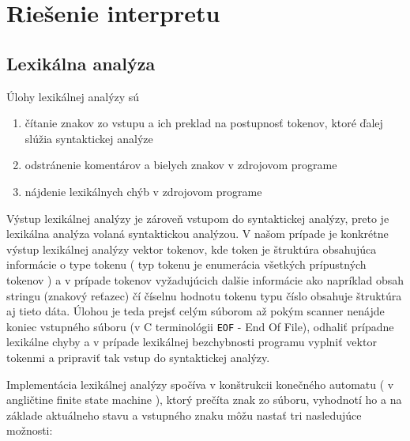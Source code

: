 \documentclass[12pt,a4paper,titlepage,final]{article}
\begin{document}
\pagestyle{plain}
\setcounter{page}{1}
\tableofcontents

\newpage
\pagestyle{plain}
\setcounter{page}{1}


\section{Riešenie interpretu} \label{Riesenie interpretu}

\subsection{Lexikálna analýza}
Úlohy lexikálnej analýzy sú
\begin{enumerate}
    \itemsep0em
    \item čítanie znakov zo vstupu a ich preklad na postupnosť tokenov, ktoré ďalej slúžia syntaktickej analýze
    \item odstránenie komentárov a bielych znakov v zdrojovom programe
    \item nájdenie lexikálnych chýb v zdrojovom programe
\end{enumerate}

Výstup lexikálnej analýzy je zároveň vstupom do syntaktickej analýzy, preto je
lexikálna analýza volaná syntaktickou analýzou. V našom prípade je konkrétne
výstup lexikálnej analýzy vektor tokenov, kde token je štruktúra obsahujúca
informácie o type tokenu ( typ tokenu je enumerácia všetkých prípustných tokenov )
a v prípade tokenov vyžadujúcich dalšie informácie ako napríklad obsah stringu
(znakový reťazec) čí číselnu hodnotu tokenu typu číslo obsahuje štruktúra aj tieto dáta.
Úlohou je teda prejsť celým súborom až pokým scanner nenájde koniec vstupného súboru
(v C terminológii \texttt{EOF} - End Of File), odhaliť prípadne lexikálne chyby a
v prípade lexikálnej bezchybnosti programu vyplniť vektor tokenmi a pripraviť
tak vstup do syntaktickej analýzy.

Implementácia lexikálnej analýzy spočíva v konštrukcii konečného automatu
( v angličtine finite state machine ), ktorý prečíta znak zo súboru, vyhodnotí
ho a na základe aktuálneho stavu a vstupného znaku môžu nastať tri nasledujúce
 možnosti:
\end{document}
